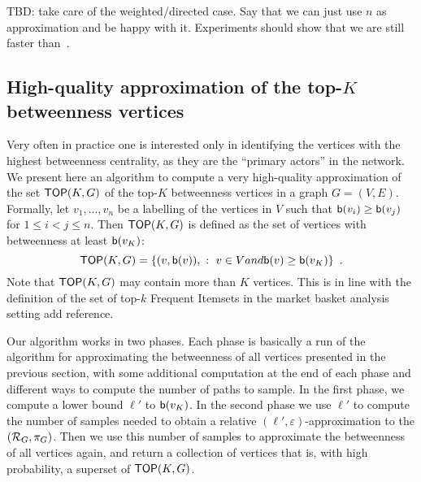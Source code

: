 \XXX TBD: take care of the weighted/directed case. Say that we can just use $n$ as
approximation and be happy with it. Experiments should show that we are still
faster than~\citet{BrandesP07}.

\subsection{High-quality approximation of the top-$K$ betweenness
vertices}\label{sec:topk}
Very often in practice one is interested only in identifying the vertices with
the highest betweenness centrality, as they are the ``primary actors'' in the
network. We present here an algorithm to compute a very high-quality
approximation of the set $\mathsf{TOP}(K,G)$ of the top-$K$ betweenness vertices in a graph
$G=(V,E)$. Formally, let $v_1,\dotsc,v_n$ be a labelling of the vertices in $V$
such that $\mathsf{b}(v_i)\ge\mathsf{b}(v_j)$ for $1\le i<j\le n$. Then $\mathsf{TOP}(K,G)$ is
defined as the set of vertices with betweenness at least $\mathsf{b}(v_K)$:
\[
\mathsf{TOP}(K,G)=\{(v,\mathsf{b}(v)), ~:~ v\in V \relax{ and } \mathsf{b}(v)\ge\mathsf{b}(v_K)\}\enspace.
\]
Note that $\mathsf{TOP}(K,G)$ may contain more than $K$ vertices. This is in line with
the definition of the set of top-$k$ Frequent Itemsets in the market basket
analysis setting \XXX add reference.

Our algorithm works in two phases. Each phase is basically a run of the
algorithm for approximating the betweenness of all vertices presented in the
previous section, with some additional computation at the end of each phase and
different ways to compute the number of paths to sample. In the first phase,
we compute a lower bound $\ell'$ to $\mathsf{b}(v_K)$. In the second phase we use
$\ell'$ to compute the number of samples needed to obtain a relative
$(\ell',\varepsilon)$-approximation to the $(\mathcal{R}_G,\pi_G)$. Then we use this
number of samples to approximate the betweenness of all vertices again, and
return a collection of vertices that is, with high probability, a superset of
$\mathsf{TOP}(K,G)$.

